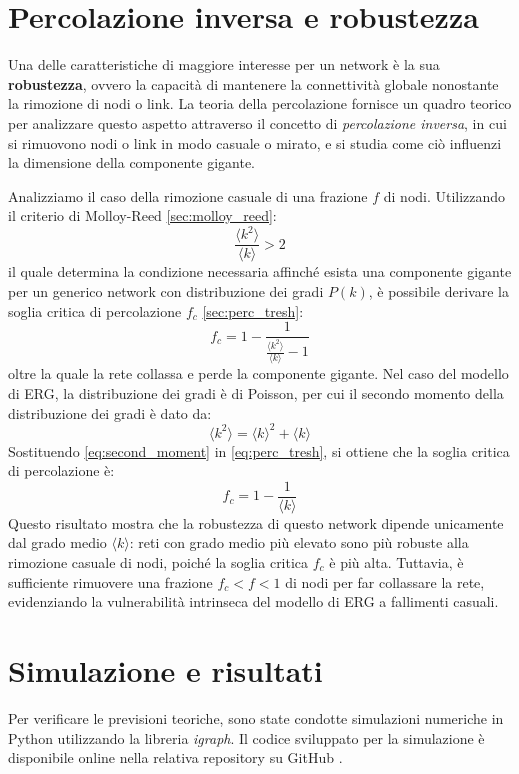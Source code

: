\documentclass[12pt,italian]{article}
\begin{document}
\section{Percolazione inversa e robustezza}
Una delle caratteristiche di maggiore interesse per un network è la sua \textbf{robustezza}, ovvero la capacità di mantenere la connettività globale nonostante la rimozione di nodi o link. La teoria della percolazione fornisce un quadro teorico per analizzare questo aspetto attraverso il concetto di \emph{percolazione inversa}, in cui si rimuovono nodi o link in modo casuale o mirato, e si studia come ciò influenzi la dimensione della componente gigante.

Analizziamo il caso della rimozione casuale di una frazione $f$ di nodi. Utilizzando il criterio di Molloy-Reed \cref{sec:molloy_reed}:
\begin{equation}
    \frac{\langle k^2 \rangle}{\langle k \rangle} > 2
\end{equation}
il quale determina la condizione necessaria affinché esista una componente gigante per un generico network con distribuzione dei gradi $P(k)$, è possibile derivare la soglia critica di percolazione $f_c$ \cref{sec:perc_tresh}:
\begin{equation} \label{eq:perc_tresh}
    f_c = 1 - \frac{1}{\frac{\langle k^2 \rangle}{\langle k \rangle} - 1}
\end{equation}
oltre la quale la rete collassa e perde la componente gigante. Nel caso del modello di ERG, la distribuzione dei gradi è di Poisson, per cui il secondo momento della distribuzione dei gradi è dato da:
\begin{equation} \label{eq:second_moment}
    \langle k^2 \rangle = \langle k \rangle^2 + \langle k \rangle
\end{equation}
Sostituendo \eqref{eq:second_moment} in  \eqref{eq:perc_tresh}, si ottiene che la soglia critica di percolazione è:
\begin{equation}
    f_c = 1 - \frac{1}{\langle k \rangle}
\end{equation}
Questo risultato mostra che la robustezza di questo network dipende unicamente dal grado medio $\langle k \rangle$: reti con grado medio più elevato sono più robuste alla rimozione casuale di nodi, poiché la soglia critica $f_c$ è più alta. Tuttavia, è sufficiente rimuovere una frazione $f_c < f < 1$ di nodi per far collassare la rete, evidenziando la vulnerabilità intrinseca del modello di ERG a fallimenti casuali.

\section{Simulazione e risultati}
Per verificare le previsioni teoriche, sono state condotte simulazioni numeriche in Python utilizzando la libreria \emph{igraph}. Il codice sviluppato per la simulazione è disponibile online nella relativa repository su GitHub \cite{codice}.
\end{document}
